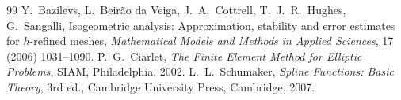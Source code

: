 \documentclass[10pt,a4paper]{amsart}
\begin{document}
\begin{thebibliography}{99}
 Y.~Bazilevs, L.~Beir\~ao da Veiga, J.~A.~Cottrell, T.~J.~R.~Hughes, G.~Sangalli, Isogeometric analysis: Approximation, stability and error estimates for $h$-refined meshes, \emph{Mathematical Models and Methods in Applied Sciences}, 17 (2006) 1031--1090.
 P.~G.~Ciarlet, \emph{The Finite Element Method for Elliptic Problems}, SIAM, Philadelphia, 2002.
 L.~L.~Schumaker, \emph{Spline Functions: Basic Theory}, 3rd ed., Cambridge University Press, Cambridge, 2007.
\end{thebibliography}
\end{document}

